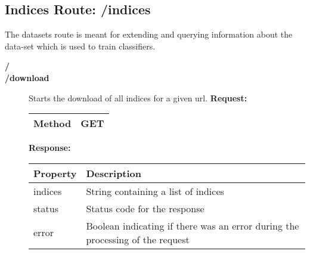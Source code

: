 \subsection{Indices Route: /indices}
The datasets route is meant for extending and querying information about the data-set which is used to train classifiers. 

\begin{description}


\item [{\large \textbf{/}}]
\item [{\large \textbf{/download}}]
Starts the download of all indices for a given url.
\newline
\newline
\textbf{Request:}
\newline
\newline
\begin{tabular}{ | l | l |}
\hline
Method & GET\\ \hline
\end{tabular}
\newline
\newline
\textbf{Response:}
\newline
\newline
\resizebox{\textwidth}{!} {
\begin{tabular}{ | l | l |}
\hline
\textbf{Property} & \textbf{Description}\\ \hline
indices & String containing a list of indices\\ \hline
status & Status code for the response\\ \hline
error & Boolean indicating if there was an error during the processing of the request\\ \hline
\end{tabular}}

\end{description}